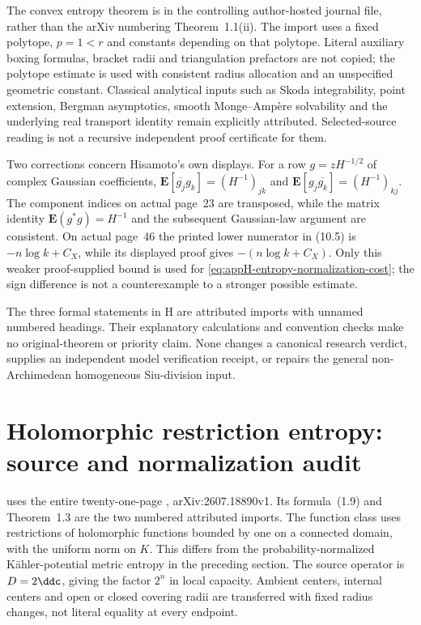 The convex entropy theorem is
\cite[Theorem~1(ii)]{GaoWellner17AuthorPublished} in the controlling
author-hosted journal file, rather than the arXiv numbering
Theorem~1.1(ii). The import uses a fixed polytope, $p=1<r$ and
constants depending on that polytope. Literal auxiliary boxing
formulas, bracket radii and triangulation prefactors are not copied;
the polytope estimate is used with consistent radius allocation and
an unspecified geometric constant. Classical analytical inputs
such as Skoda integrability, point extension, Bergman asymptotics,
smooth Monge--Amp\`ere solvability and the underlying real transport
identity remain explicitly attributed. Selected-source reading is
not a recursive independent proof certificate for them.

Two corrections concern Hisamoto's own displays. For a row
$g=zH^{-1/2}$ of complex Gaussian coefficients,
$\mathbf E[\overline{g_j}g_k]=(H^{-1})_{jk}$ and
$\mathbf E[g_j\overline{g_k}]=(H^{-1})_{kj}$.
The component indices on actual page~23 are transposed, while the
matrix identity $\mathbf E(g^*g)=H^{-1}$ and the subsequent
Gaussian-law argument are consistent. On actual page~46 the
printed lower numerator in (10.5) is $-n\log k+C_X$, while its
displayed proof gives $-(n\log k+C_X)$. Only this weaker
proof-supplied bound is used for
\eqref{eq:appH-entropy-normalization-cost}; the sign difference
is not a counterexample to a stronger possible estimate.

The three formal statements in H are attributed imports with
unnamed numbered headings. Their explanatory calculations and
convention checks make no original-theorem or priority claim.
None changes a canonical research verdict, supplies an independent
model verification receipt, or repairs the general non-Archimedean
homogeneous Siu-division input.

\section{Holomorphic restriction entropy: source and normalization audit}
\label{sec:appL-holomorphic-entropy-sources}

 uses the entire twenty-one-page
\cite{Finski26HolomorphicEntropyV1}, arXiv:2607.18890v1.
Its formula~(1.9) and Theorem~1.3 are the two numbered attributed
imports. The function class uses restrictions of holomorphic
functions bounded by one on a connected domain, with the uniform
norm on $K$. This differs from the probability-normalized
K\"ahler-potential metric entropy in the preceding section.
The source operator is $D=2\ddc$, giving the factor $2^n$ in
local capacity. Ambient centers, internal centers and open or
closed covering radii are transferred with fixed radius changes,
not literal equality at every endpoint.


